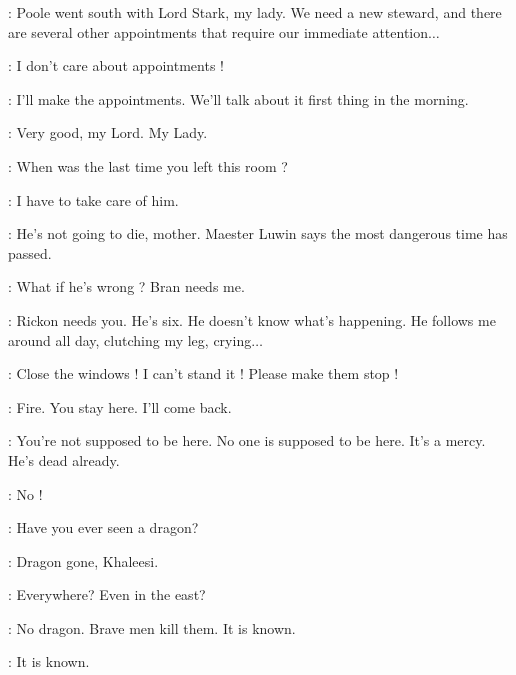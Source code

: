 \LUWIN: Poole went south with Lord Stark, my lady. We need a new steward, and there are several other appointments that require our immediate attention$\ldots$ 

\CATELYN: I don't care about appointments ! 


\ROBB: I'll make the appointments. We'll talk about it first thing in the morning. 

\LUWIN: Very good, my Lord. My Lady. 


\ROBB: When was the last time you left this room ? 

\CATELYN: I have to take care of him. 

\ROBB: He's not going to die, mother. Maester Luwin says the most dangerous time has passed. 

\CATELYN: What if he's wrong ? Bran needs me. 

\ROBB: Rickon needs you. He's six. He doesn't know what's happening. He follows me around all day, clutching my leg, crying$\ldots$ 

\CATELYN: Close the windows ! I can't stand it ! Please make them stop ! 

\ROBB: Fire. You stay here. I'll come back. 


\MAN: You're not supposed to be here. No one is supposed to be here. It's a mercy. He's dead already. 

\CATELYN: No ! 


\scene



\DAENERYS: Have you ever seen a dragon? 

\IRRI: Dragon gone, Khaleesi. 

\DAENERYS: Everywhere? Even in the east? 

\IRRI: No dragon. Brave men kill them. It is known. 

\JHIQUI: It is known. 

